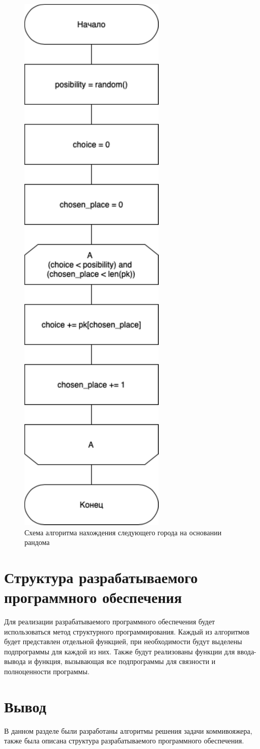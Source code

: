 \begin{figure}[h]
    \centering
    \includegraphics[width=0.25\linewidth]{img/rand.pdf}
    \caption{Схема алгоритма нахождения следующего города на основании рандома}
    \label{img:rand}
\end{figure}
\noindent

\clearpage
\section{Структура разрабатываемого программного обеспечения}

Для реализации разрабатываемого программного обеспечения будет использоваться
метод структурного программирования. Каждый из алгоритмов будет представлен
отдельной функцией, при необходимости будут выделены подпрограммы для каждой из
них. Также будут реализованы функции для ввода-вывода и функция, вызывающая все
подпрограммы для связности и полноценности программы.

\section*{Вывод}

В данном разделе были разработаны алгоритмы решения задачи коммивояжера, также была
описана структура разрабатываемого программного обеспечения.
